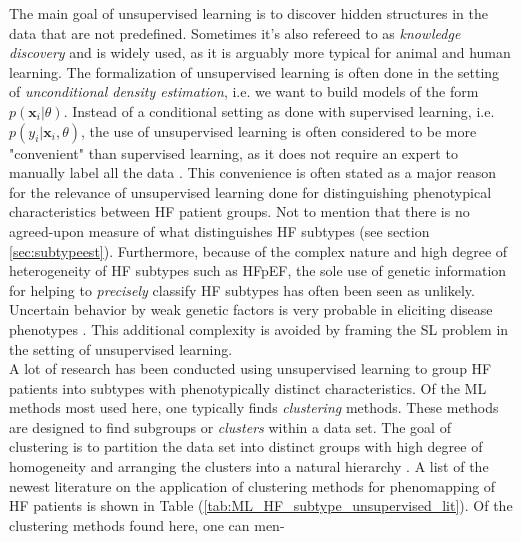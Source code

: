 \documentclass[../thesis.tex]{subfiles}
\begin{document}
\noindent The main goal of unsupervised learning is to discover hidden structures in the data that are not predefined. Sometimes it's also refereed to as \textit{knowledge discovery} and is widely used, as it is arguably more typical for animal and human learning. The formalization of unsupervised learning is often done in the setting of \textit{unconditional density estimation}, i.e. we want to build models of the form $p(\mathbf{x}_i | \theta)$. Instead of a conditional setting as done with supervised learning, i.e. $p(y_i | \mathbf{x}_i, \theta)$, the use of unsupervised learning is often considered to be more "convenient" than supervised learning, as it does not require an expert to manually label all the data \citep{muphy2012machine}. This convenience is often stated as a major reason for the relevance of unsupervised learning done for distinguishing phenotypical characteristics between HF patient groups. Not to mention that there is no agreed-upon measure of what distinguishes HF subtypes (see section \ref{sec:subtypeest}). Furthermore, because of the complex nature and high degree of heterogeneity of HF subtypes such as HFpEF, the sole use of genetic information for helping to \textit{precisely} classify HF subtypes has often been seen as unlikely. Uncertain behavior by weak genetic factors is very probable in eliciting disease phenotypes \citep{deo2015machine}. This additional complexity is avoided by framing the SL problem in the setting of unsupervised learning.\\
\indent A lot of research has been conducted using unsupervised learning to group HF patients into subtypes with phenotypically distinct characteristics. Of the ML methods most used here, one typically finds \textit{clustering} methods. These methods are designed to find subgroups or \textit{clusters} within a data set. The goal of clustering is to partition the data set into distinct groups with high degree of homogeneity and arranging the clusters into a natural hierarchy \citep{friedman2009elements}. A list of the newest literature on the application of clustering methods for phenomapping of HF patients is shown in Table (\ref{tab:ML_HF_subtype_unsupervised_lit}). Of the clustering methods found here, one can men-


\end{document}
